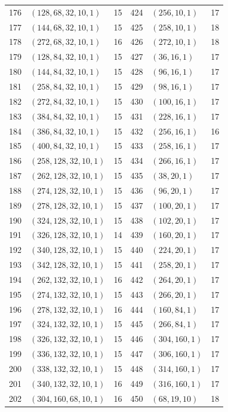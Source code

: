 \begin{longtable}{@{}rlr@{\hspace{12mm}}rlr@{}}
176 & $(128,68,32,10,1)$ & 15 & 424 & $(256,10,1)$ & 17\\
177 & $(144,68,32,10,1)$ & 15 & 425 & $(258,10,1)$ & 18\\
178 & $(272,68,32,10,1)$ & 16 & 426 & $(272,10,1)$ & 18\\
179 & $(128,84,32,10,1)$ & 15 & 427 & $(36,16,1)$ & 17\\
180 & $(144,84,32,10,1)$ & 15 & 428 & $(96,16,1)$ & 17\\
181 & $(258,84,32,10,1)$ & 15 & 429 & $(98,16,1)$ & 17\\
182 & $(272,84,32,10,1)$ & 15 & 430 & $(100,16,1)$ & 17\\
183 & $(384,84,32,10,1)$ & 15 & 431 & $(228,16,1)$ & 17\\
184 & $(386,84,32,10,1)$ & 15 & 432 & $(256,16,1)$ & 16\\
185 & $(400,84,32,10,1)$ & 15 & 433 & $(258,16,1)$ & 17\\
186 & $(258,128,32,10,1)$ & 15 & 434 & $(266,16,1)$ & 17\\
187 & $(262,128,32,10,1)$ & 15 & 435 & $(38,20,1)$ & 17\\
188 & $(274,128,32,10,1)$ & 15 & 436 & $(96,20,1)$ & 17\\
189 & $(278,128,32,10,1)$ & 15 & 437 & $(100,20,1)$ & 17\\
190 & $(324,128,32,10,1)$ & 15 & 438 & $(102,20,1)$ & 17\\
191 & $(326,128,32,10,1)$ & 14 & 439 & $(160,20,1)$ & 17\\
192 & $(340,128,32,10,1)$ & 15 & 440 & $(224,20,1)$ & 17\\
193 & $(342,128,32,10,1)$ & 15 & 441 & $(258,20,1)$ & 17\\
194 & $(262,132,32,10,1)$ & 16 & 442 & $(264,20,1)$ & 17\\
195 & $(274,132,32,10,1)$ & 15 & 443 & $(266,20,1)$ & 17\\
196 & $(278,132,32,10,1)$ & 16 & 444 & $(160,84,1)$ & 17\\
197 & $(324,132,32,10,1)$ & 15 & 445 & $(266,84,1)$ & 17\\
198 & $(326,132,32,10,1)$ & 15 & 446 & $(304,160,1)$ & 17\\
199 & $(336,132,32,10,1)$ & 15 & 447 & $(306,160,1)$ & 17\\
200 & $(338,132,32,10,1)$ & 15 & 448 & $(314,160,1)$ & 17\\
201 & $(340,132,32,10,1)$ & 16 & 449 & $(316,160,1)$ & 17\\
202 & $(304,160,68,10,1)$ & 16 & 450 & $(68,19,10)$ & 18\\

\end{longtable}
